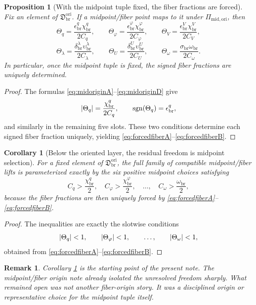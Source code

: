 \documentclass[11pt]{article}
\newcommand{\OriginSector}{\mathfrak D_{\mathrm{br}}^{\mathrm{ori}}}
\newcommand{\AbsReadAmp}{\chi_{\mathrm{br}}^{q}}
\newcommand{\AbsCovAmp}{\chi_{\mathrm{br}}^{\varphi}}
\newcommand{\AbsRelaxAmp}{\chi_{\mathrm{br}}^{V}}
\newcommand{\AbsWellAmp}{\upsilon_{\mathrm{br}}^{\lambda}}
\newcommand{\AbsEqAmp}{\upsilon_{\mathrm{br}}^{U}}
\newcommand{\AbsScaleAmp}{\omega_{\mathrm{br}}}
\newcommand{\PolRead}{\epsilon_{\mathrm{br}}^{q}}
\newcommand{\PolCov}{\epsilon_{\mathrm{br}}^{\varphi}}
\newcommand{\PolRelax}{\epsilon_{\mathrm{br}}^{V}}
\newcommand{\PolWell}{\delta_{\mathrm{br}}^{\lambda}}
\newcommand{\PolEq}{\delta_{\mathrm{br}}^{U}}
\newcommand{\PolScale}{\sigma_{\mathrm{br}}}
\newcommand{\MidOriginMap}{\Pi_{\mathrm{mid,ori}}}
\newcommand{\MidRead}{C_{q}}
\newcommand{\MidCov}{C_{\varphi}}
\newcommand{\MidRelax}{C_{V}}
\newcommand{\MidWell}{C_{\lambda}}
\newcommand{\MidEq}{C_{U}}
\newcommand{\MidScale}{C_{\omega}}
\newcommand{\FiberRead}{\Theta_{q}}
\newcommand{\FiberCov}{\Theta_{\varphi}}
\newcommand{\FiberRelax}{\Theta_{V}}
\newcommand{\FiberWell}{\Theta_{\lambda}}
\newcommand{\FiberEq}{\Theta_{U}}
\newcommand{\FiberScale}{\Theta_{\omega}}
\newtheorem{proposition}{Proposition}
\newtheorem{remark}{Remark}
\newtheorem{corollary}{Corollary}
\begin{document}
\begin{proposition}[With the midpoint tuple fixed, the fiber fractions are forced]
\label{prop:forced}
Fix an element of \(\OriginSector\). If a midpoint/fiber point maps to it under \(\MidOriginMap\), then
\begin{equation}
\FiberRead=\frac{\PolRead\AbsReadAmp}{2\MidRead},
\qquad
\FiberCov=\frac{\PolCov\AbsCovAmp}{2\MidCov},
\qquad
\FiberRelax=\frac{\PolRelax\AbsRelaxAmp}{2\MidRelax},
\label{eq:forcedfiberA}
\end{equation}
\begin{equation}
\FiberWell=\frac{\PolWell\AbsWellAmp}{2\MidWell},
\qquad
\FiberEq=\frac{\PolEq\AbsEqAmp}{2\MidEq},
\qquad
\FiberScale=\frac{\PolScale\AbsScaleAmp}{2\MidScale}.
\label{eq:forcedfiberB}
\end{equation}
In particular, once the midpoint tuple is fixed, the signed fiber fractions are uniquely determined.
\end{proposition}

\begin{proof}
The formulas \eqref{eq:midoriginA}--\eqref{eq:midoriginD} give
\[
\abs{\FiberRead}=\frac{\AbsReadAmp}{2\MidRead},
\qquad
\operatorname{sgn}(\FiberRead)=\PolRead,
\]
and similarly in the remaining five slots. These two conditions determine each signed fiber fraction uniquely, yielding \eqref{eq:forcedfiberA}--\eqref{eq:forcedfiberB}.
\end{proof}

\begin{corollary}[Below the oriented layer, the residual freedom is midpoint selection]
\label{cor:midfreedom}
For a fixed element of \(\OriginSector\), the full family of compatible midpoint/fiber lifts is parameterized exactly by the six positive midpoint choices satisfying
\[
\MidRead>\frac{\AbsReadAmp}{2},
\quad
\MidCov>\frac{\AbsCovAmp}{2},
\quad
\ldots,
\quad
\MidScale>\frac{\AbsScaleAmp}{2},
\]
because the fiber fractions are then uniquely forced by \eqref{eq:forcedfiberA}--\eqref{eq:forcedfiberB}.
\end{corollary}

\begin{proof}
The inequalities are exactly the slotwise conditions
\[
\abs{\FiberRead}<1,
\qquad
\abs{\FiberCov}<1,
\qquad
\ldots,
\qquad
\abs{\FiberScale}<1,
\]
obtained from \eqref{eq:forcedfiberA}--\eqref{eq:forcedfiberB}.
\end{proof}

\begin{remark}
Corollary \ref{cor:midfreedom} is the starting point of the present note. The midpoint/fiber origin note already isolated the unresolved freedom sharply. What remained open was not another fiber-origin story. It was a disciplined origin or representative choice for the midpoint tuple itself.
\end{remark}
\end{document}
